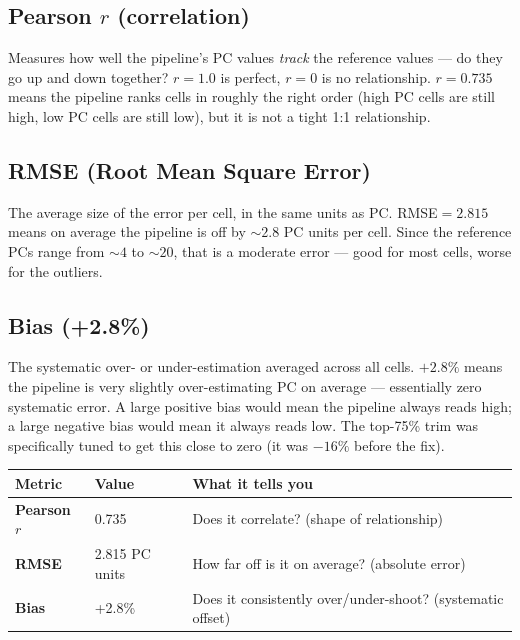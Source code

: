 \documentclass[11pt]{article}
\begin{document}
\subsection*{Pearson $r$ (correlation)}
Measures how well the pipeline's PC values \textit{track} the reference values --- do they go up and down together? $r=1.0$ is perfect, $r=0$ is no relationship. $r=0.735$ means the pipeline ranks cells in roughly the right order (high PC cells are still high, low PC cells are still low), but it is not a tight 1:1 relationship.

\subsection*{RMSE (Root Mean Square Error)}
The average size of the error per cell, in the same units as PC. RMSE$=2.815$ means on average the pipeline is off by ${\sim}2.8$ PC units per cell. Since the reference PCs range from ${\sim}4$ to ${\sim}20$, that is a moderate error --- good for most cells, worse for the outliers.

\subsection*{Bias (+2.8\%)}
The systematic over- or under-estimation averaged across all cells. $+2.8\%$ means the pipeline is very slightly over-estimating PC on average --- essentially zero systematic error. A large positive bias would mean the pipeline always reads high; a large negative bias would mean it always reads low. The top-75\% trim was specifically tuned to get this close to zero (it was $-16\%$ before the fix).

\vspace{8pt}
\begin{tabular}{>{\bfseries}p{4cm} p{2.5cm} p{7.5cm}}
\toprule
Metric & Value & What it tells you \\
\midrule
Pearson $r$  & 0.735          & Does it correlate? (shape of relationship) \\[4pt]
RMSE         & 2.815 PC units & How far off is it on average? (absolute error) \\[4pt]
Bias         & +2.8\%         & Does it consistently over/under-shoot? (systematic offset) \\
\bottomrule
\end{tabular}
\end{document}
